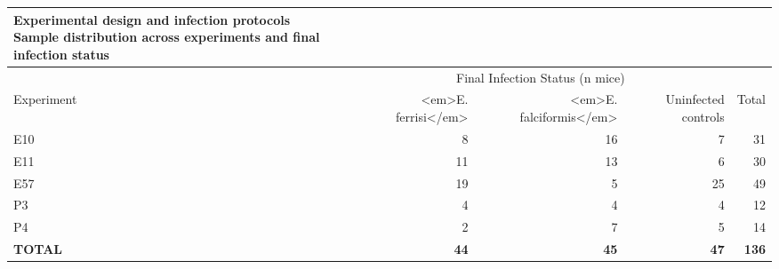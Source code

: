 \begin{longtable}{lrrrr}
\caption*{
{\large Experimental design and infection protocols} \\ 
{\small Sample distribution across experiments and final infection status}
} \\ 
\toprule
 & \multicolumn{3}{c}{Final Infection Status (n mice)} &  \\ 
\cmidrule(lr){2-4}
Experiment & <em>E. ferrisi</em> & <em>E. falciformis</em> & Uninfected controls & Total \\ 
\midrule\addlinespace[2.5pt]
E10 & 8 & 16 & 7 & 31 \\ 
E11 & 11 & 13 & 6 & 30 \\ 
E57 & 19 & 5 & 25 & 49 \\ 
P3 & 4 & 4 & 4 & 12 \\ 
P4 & 2 & 7 & 5 & 14 \\ 
\textbf{TOTAL} & \textbf{44} & \textbf{45} & \textbf{47} & \textbf{136} \\ 
\bottomrule
\end{longtable}

